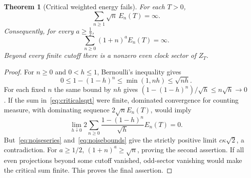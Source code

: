 \documentclass[11pt]{article}
\newtheorem{theorem}{Theorem}[section]
\begin{document}
\begin{theorem}[Critical weighted energy fails]\label{thm:critical}
For each $T>0$,
\begin{equation}\label{eq:criticalsqrt}
 \sum_{n\geq1}\sqrt n\,E_n(T)=\infty.
\end{equation}
Consequently, for every $a\geq\tfrac12$,
\[
 \sum_{n\geq0}(1+n)^aE_n(T)=\infty.
\]
Beyond every finite cutoff there is a nonzero even clock sector of
$Z_T$.
\end{theorem}
\begin{proof}
For $n\geq0$ and $0<h\leq1$, Bernoulli's inequality gives
\[
 0\leq1-(1-h)^n\leq\min(1,nh)\leq\sqrt{nh}.
\]
For each fixed $n$ the same bound by $nh$ gives
$(1-(1-h)^n)/\sqrt h\leq n\sqrt h\to0$.
If the sum in~\eqref{eq:criticalsqrt} were finite, dominated
convergence for counting measure, with dominating sequence
$2\sqrt n E_n(T)$, would imply
\[
 \lim_{h\downarrow0}
 2\sum_{n\geq0}\frac{1-(1-h)^n}{\sqrt h}E_n(T)=0.
\]
But~\eqref{eq:noiseseries} and~\eqref{eq:noisebounds} give the
strictly positive limit $c\kappa\sqrt2$, a contradiction.
For $a\geq1/2$, $(1+n)^a\geq\sqrt n$, proving the second
assertion. If all even projections beyond some cutoff vanished,
odd-sector vanishing would make the critical sum finite. This proves
the final assertion.
\end{proof}
\end{document}
